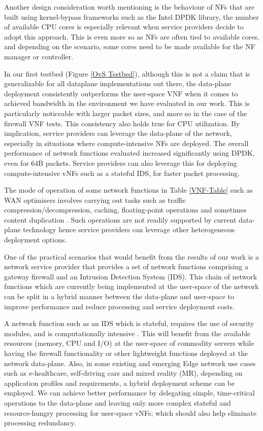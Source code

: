 \documentclass[conference]{IEEEtran}
\begin{document}
Another design consideration worth mentioning is the behaviour of NFs that are built using kernel-bypass frameworks such as the Intel DPDK library, the number of available CPU cores is especially relevant when service providers decide to adopt this approach. This is even more so as NFs are often tied to available cores, and depending on the scenario, some cores need to be made available for the NF manager or controller. 

In our first testbed (Figure \ref{OvS Testbed}), although this is not a claim that is generalizable for all dataplane implementations out there, the data-plane deployment consistently outperforms the user-space VNF when it comes to achieved bandwidth in the environment we have evaluated in our work. This is particularly noticeable with larger packet sizes, and more so in the case of the firewall VNF tests. This consistency also holds true for CPU utilization. By implication, service providers can leverage the data-plane of the network, especially in situations where compute-intensive NFs are deployed. The overall performance of network functions evaluated increased significantly using DPDK, even for 64B packets. Service providers can also leverage this for deploying compute-intensive vNFs such as a stateful IDS, for faster packet processing.

The mode of operation of some network functions in Table \ref{VNF-Table} such as WAN optimisers involves carrying out tasks such as traffic compression/decompression, caching, floating-point operations and sometimes content duplication \cite{he2022joint}. Such operations are not readily supported by current data-plane technology hence service providers can leverage other heterogeneous deployment options.


One of the practical scenarios that would benefit from the results of our work is a network service provider that provides a set of network functions comprising a gateway firewall and an Intrusion Detection System (IDS). This chain of network functions which are currently being implemented at the user-space of the network can be split in a hybrid manner between the data-plane and user-space to improve performance and reduce processing and service deployment costs. 

A network function such as an IDS which is stateful, requires the use of security modules, and is computationally intensive \cite{chen2022automatic}. This will benefit from the available resources (memory, CPU and I/O) at the user-space of commodity servers while having the firewall functionality or other lightweight functions deployed at the network data-plane. Also, in some existing and emerging Edge network use cases such as e-healthcare, self-driving cars and mixed reality (MR), depending on application profiles and requirements, a hybrid deployment scheme can be employed. We can achieve better performance by delegating simple, time-critical operations to the data-plane and leaving only more complex stateful and resource-hungry processing for user-space vNFs; which should also help eliminate processing redundancy.  
\end{document}
